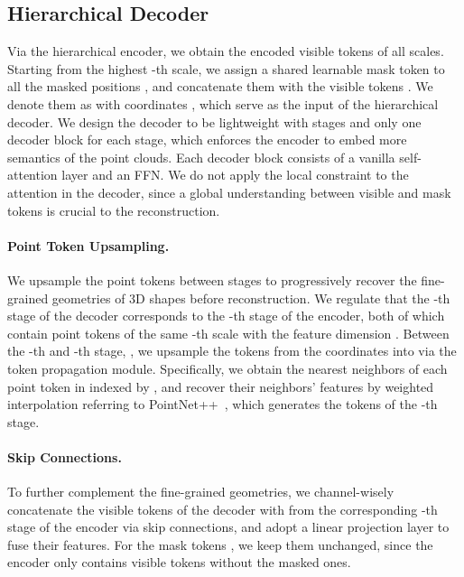 \documentclass{article}
\begin{document}
\subsection{Hierarchical Decoder}
\label{hdecoder}
Via the hierarchical encoder, we obtain the encoded visible tokens  of all scales. Starting from the highest -th scale, we assign a shared learnable mask token to all the masked positions , and concatenate them with the visible tokens .
We denote them as  with coordinates , which serve as the input of the hierarchical decoder.
We design the decoder to be lightweight with  stages and only one decoder block for each stage, which enforces the encoder to embed more semantics of the point clouds. Each decoder block consists of a vanilla self-attention layer and an FFN. We do not apply the local constraint to the attention in the decoder, since a global understanding between visible and mask tokens is crucial to the reconstruction.
\paragraph{Point Token Upsampling.}
We upsample the point tokens between stages to progressively recover the fine-grained geometries of 3D shapes before reconstruction. We regulate that the -th stage of the decoder corresponds to the -th stage of the encoder, both of which contain point tokens of the same -th scale with the feature dimension .
Between the -th and -th stage, , we upsample the tokens  from the coordinates  into  via the token propagation module. Specifically, we obtain the  nearest neighbors of each point token in  indexed by , and recover their neighbors' features by weighted interpolation referring to PointNet++~\cite{qi2017pointnet++}, which generates the tokens  of the -th stage.

\paragraph{Skip Connections.} 
To further complement the fine-grained geometries, we channel-wisely concatenate the visible tokens  of the decoder with  from the corresponding -th stage of the encoder via skip connections, and adopt a linear projection layer to fuse their features. For the mask tokens , we keep them unchanged, since the encoder only contains visible tokens without the masked ones.
\end{document}
